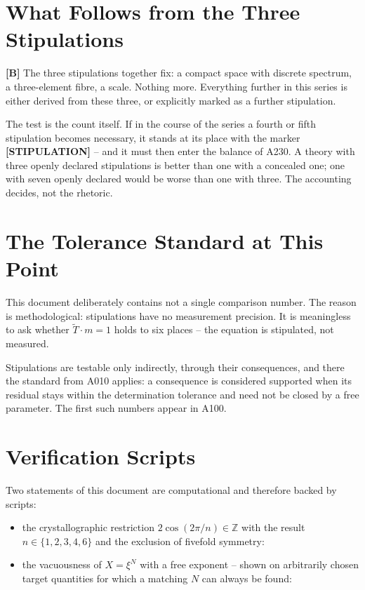 \section{What Follows from the Three Stipulations}

\textbf{[B]} The three stipulations together fix: a compact space with
discrete spectrum, a three-element fibre, a scale. Nothing more. Everything
further in this series is either derived from these three, or explicitly
marked as a further stipulation.

The test is the count itself. If in the course of the series a fourth or
fifth stipulation becomes necessary, it stands at its place with the marker
\textbf{[STIPULATION]} -- and it must then enter the balance of A230. A
theory with three openly declared stipulations is better than one with a
concealed one; one with seven openly declared would be worse than one with
three. The accounting decides, not the rhetoric.

\section{The Tolerance Standard at This Point}

This document deliberately contains not a single comparison number. The
reason is methodological: stipulations have no measurement precision. It is
meaningless to ask whether $\tilde T\cdot m = 1$ holds to six places --
the equation is stipulated, not measured.

Stipulations are testable only indirectly, through their consequences, and
there the standard from A010 applies: a consequence is considered supported
when its residual stays within the determination tolerance and need not be
closed by a free parameter. The first such numbers appear in A100.

\section{Verification Scripts}

Two statements of this document are computational and therefore backed by
scripts:

\begin{itemize}
  \item the crystallographic restriction $2\cos(2\pi/n)\in\mathbb{Z}$ with
    the result $n\in\{1,2,3,4,6\}$ and the exclusion of fivefold symmetry:
  \item the vacuousness of $X=\xi^N$ with a free exponent -- shown on
    arbitrarily chosen target quantities for which a matching $N$ can always
    be found: 
\end{itemize}

